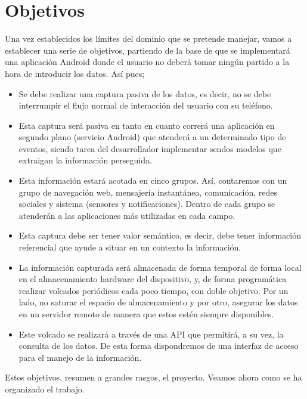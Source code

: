 \documentclass[12pt,a4paper,oneside]{book} %
\begin{document}
\chapter{Objetivos}
Una vez establecidos los límites del dominio que se pretende manejar, vamos a establecer una serie de objetivos, partiendo de la base de que se implementará una aplicación Android donde el usuario no deberá tomar ningún partido a la hora de introducir los datos. Así pues; 
\begin{itemize}
\item Se debe realizar una captura pasiva de los datos, es decir, no se debe interrumpir el flujo normal de interacción del usuario con su teléfono. 
\item Esta captura será pasiva en tanto en cuanto correrá una aplicación en segundo plano (servicio Android) que atenderá a un determinado tipo de eventos, siendo tarea del desarrollador implementar sendos modelos que extraigan la información perseguida. 
\item Esta información estará acotada en cinco grupos. Así, contaremos con un grupo de navegación web, mensajería instantánea, comunicación, redes sociales y sistema (sensores y notificaciones). Dentro de cada grupo se atenderán a las aplicaciones más utilizadas en cada campo. 
\item Esta captura debe ser tener valor semántico, es decir, debe tener información referencial que ayude a situar en un contexto la información. 
\item La información capturada será almacenada de forma temporal de forma local en el almacenamiento hardware del dispositivo, y, de forma programática realizar volcados periódicos cada poco tiempo, con doble objetivo. Por un lado, no saturar el espacio de almacenamiento y por otro, asegurar los datos en un servidor remoto de manera que estos estén siempre disponibles. 
\item Este volcado se realizará a través de una API que permitirá, a su vez, la consulta de los datos. De esta forma dispondremos de una interfaz de acceso para el manejo de la información. 
\end{itemize}
Estos objetivos, resumen a grandes rasgos, el proyecto. Veamos ahora como se ha organizado el trabajo. 
\end{document}
